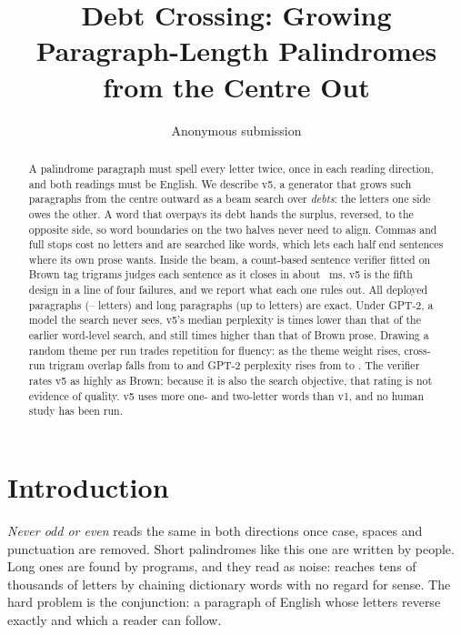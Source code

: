 \documentclass[11pt]{article}
\title{Debt Crossing: Growing Paragraph-Length Palindromes\\from the Centre Out}
\author{Anonymous submission}
\newcommand{\w}[1]{\emph{#1}}
\begin{document}
\maketitle

\begin{abstract}
A palindrome paragraph must spell every letter twice, once in each reading direction, and both readings must be English. We describe v5, a generator that grows such paragraphs from the centre outward as a beam search over \emph{debts}: the letters one side owes the other. A word that overpays its debt hands the surplus, reversed, to the opposite side, so word boundaries on the two halves never need to align. Commas and full stops cost no letters and are searched like words, which lets each half end sentences where its own prose wants. Inside the beam, a count-based sentence verifier fitted on Brown tag trigrams judges each sentence as it closes in about \verifierMs{}~ms. v5 is the fifth design in a line of four failures, and we report what each one rules out. All \vFiveLiveN{} deployed paragraphs (\vFiveLiveLettersMin--\vFiveLiveLettersMax{} letters) and \vFiveSophiaN{} long paragraphs (up to \vFiveSophiaLettersMax{} letters) are exact. Under GPT-2, a model the search never sees, v5's median perplexity is \pplRatioVOne{} times lower than that of the earlier word-level search, and still \pplRatioBrownLive{} times higher than that of Brown prose. Drawing a random theme per run trades repetition for fluency: as the theme weight rises, cross-run trigram overlap falls from \themeOverlapZero{} to \themeOverlapFifteen{} and GPT-2 perplexity rises from \themePPLZero{} to \themePPLFifteen. The verifier rates v5 as highly as Brown; because it is also the search objective, that rating is not evidence of quality. v5 uses more one- and two-letter words than v1, and no human study has been run.
\end{abstract}

\section{Introduction}

\w{Never odd or even} reads the same in both directions once case, spaces and punctuation are removed. Short palindromes like this one are written by people. Long ones are found by programs, and they read as noise: \citet{norvig2002palindrome} reaches tens of thousands of letters by chaining dictionary words with no regard for sense. The hard problem is the conjunction: a paragraph of English whose letters reverse exactly and which a reader can follow.
\end{document}
